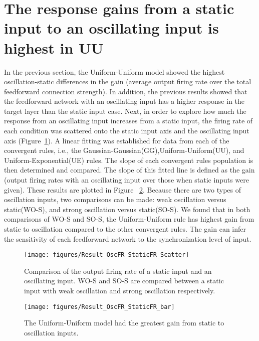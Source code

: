 \section{The response gains from a static input to an oscillating input is highest in UU}
 In the previous section, the Uniform-Uniform model showed the highest oscillation-static differences in the gain (average output firing rate over the total feedforward connection strength). In addition, the previous results showed that the feedforward network with an oscillating input has a higher response in the target layer than the static input case. 
Next, in order to explore how much the response from an oscillating input increases from a static input, the firing rate of each condition was scattered onto the static input axis and the oscillating input axis (Figure~\ref{fig:ResFunDiffOscS}). A linear fitting was established for data from each of the convergent rules, i.e., the Gaussian-Gaussian(GG),Uniform-Uniform(UU), and Uniform-Exponential(UE) rules. The slope of each convergent rules population is then determined and compared. The slope of this fitted line is defined as the gain (output firing rates with an oscillating input over those when static inputs were given). These results are plotted in Figure ~\ref{fig:ResFunDiffOscS_hp}. Because there are two types of oscillation inputs, two comparisons can be made: weak oscillation versus static(WO-S), and strong oscillation versus static(SO-S). We found that in both comparisons of WO-S and SO-S, the Uniform-Uniform rule has highest gain from static to oscillation compared to the other convergent rules. The gain can infer the sensitivity of each feedforward network to the synchronization level of input. 



\begin{figure}[!h]
	\centering
	\texttt{[image: figures/Result\_OscFR\_StaticFR\_Scatter]}
	\caption{Comparison of the output firing rate of a static input and an oscillating input. WO-S and SO-S are compared between a static input with weak oscillation and strong oscillation respectively.}
	\label{fig:ResFunDiffOscS}
\end{figure}


\begin{figure}[!h]
	\centering
	\texttt{[image: figures/Result\_OscFR\_StaticFR\_bar]}
	\caption{The Uniform-Uniform model had the greatest gain from static to oscillation inputs.}
	\label{fig:ResFunDiffOscS_hp}
\end{figure}

